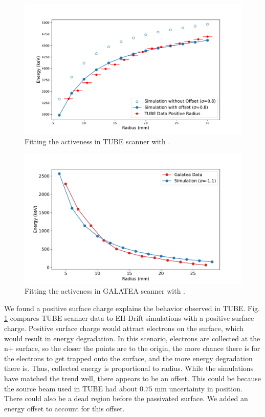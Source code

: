 \begin{figure}%
\includegraphics[trim={0.3cm 0.1cm 1.7cm 0.1cm},clip,width=\linewidth]{ch5/figs/tube_fit.pdf}
\caption{Fitting the activeness in TUBE scanner with \ehd{}.}
\label{fig:tube_fit}
\end{figure}


\begin{figure}%
\includegraphics[trim={0.3cm 0.1cm 1.7cm 1cm},clip,width=\linewidth]{ch5/figs/gal_fit.pdf}
\caption{Fitting the activeness in GALATEA scanner with \ehd{}.}
\label{fig:gal_fit}
\end{figure}

We found a positive surface charge explains the behavior observed in TUBE. Fig. \ref{fig:tube_fit} compares TUBE scanner data to EH-Drift simulations with a positive surface charge. Positive surface charge would attract electrons on the surface, which would result in energy degradation. In this scenario, electrons are collected at the n+ surface, so the closer the points are to the origin, the more chance there is for the electrons to get trapped onto the surface, and the more energy degradation there is. Thus, collected energy is proportional to radius. While the simulations have matched the trend well, there appears to be an offset. This could be because the source beam used in TUBE had about $0.75$ mm uncertainty in position. There could also be a dead region before the passivated surface. We added an energy offset to account for this offset.

